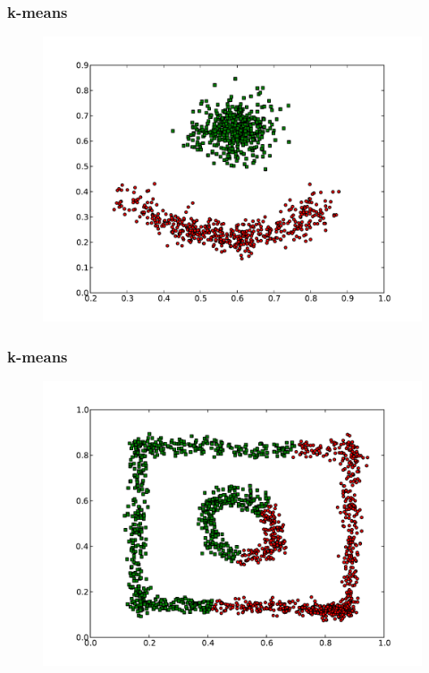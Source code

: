 \documentclass{beamer}
\begin{document}

\begin{frame}
\frametitle{k-means}
    \begin{figure}[]
    \includegraphics[scale=0.5]{kmeans_red-blue-clusters.pdf}
    \end{figure}
\end{frame}

\begin{frame}
\frametitle{k-means}
    \begin{figure}[]
    \includegraphics[scale=0.5]{kmeans_circle-weird.pdf}
    \end{figure}
\end{frame}
\end{document}

